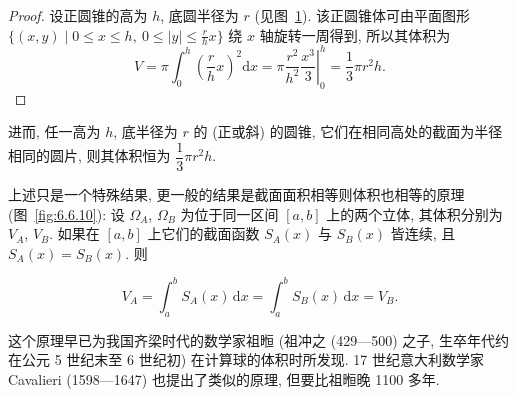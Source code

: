 \begin{proof}
设正圆锥的高为 $h$, 底圆半径为 $r$ (见图~\ref{fig:6.6.9}). 该正圆锥体可由平面图形 $\{(x,y)\mid0\leqslant x\leqslant h,\allowbreak\ 0\leqslant|y|\leqslant\frac{r}{h}x\}$ 绕 $x$ 轴旋转一周得到, 所以其体积为
\[
V=\pi\int_{0}^{h}\left(\frac{r}{h}x\right)^{2}\mathrm{d}x=\left.\pi\frac{r^{2}}{h^{2}}\frac{x^{3}}{3}\right|_{0}^{h}=\frac{1}{3}\pi r^{2}h.
\]
\end{proof}

进而, 任一高为 $h$, 底半径为 $r$ 的 (正或斜) 的圆锥, 它们在相同高处的截面为半径相同的圆片, 则其体积恒为 $\dfrac{1}{3}\pi r^{2}h$.

\begin{figure}[htbp]
\centering
{}
\caption{}\label{fig:6.6.9}
\end{figure}

\begingroup{}
上述只是一个特殊结果, 更一般的结果是截面面积相等则体积也相等的原理 (图~\ref{fig:6.6.10}): 设 $\Omega_{A}$, $\Omega_{B}$ 为位于同一区间 $[a,b]$ 上的两个立体, 其体积分别为 $V_{A}$, $V_{B}$. 如果在 $[a,b]$ 上它们的截面函数 $S_{A}(x)$ 与 $S_{B}(x)$ 皆连续, 且 $S_{A}(x)=S_{B}(x)$. 则\endgroup

\[
V_{A}=\int_{a}^{b}S_{A}(x)\,\mathrm{d}x=\int_{a}^{b}S_{B}(x)\,\mathrm{d}x=V_{B}.
\]

这个原理早已为我国齐梁时代的数学家祖{\zmbhan 暅} (祖冲之 (429—500) 之子, 生卒年代约在公元 5 世纪末至 6 世纪初) 在计算球的体积时所发现. 17 世纪意大利数学家 Cavalieri (1598—1647) 也提出了类似的原理, 但要比祖{\zmbhan 暅}晚 1100 多年.

